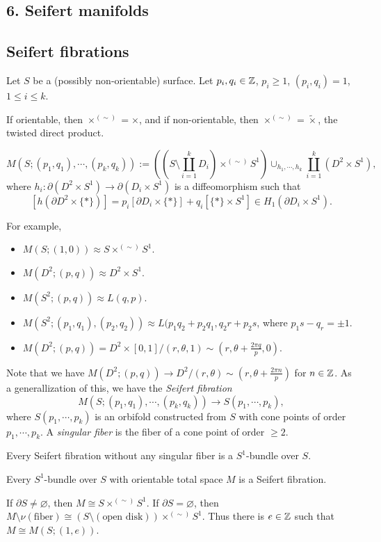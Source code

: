 \documentclass{../../../small}
\begin{document}
\setcounter{section}{6}
\subsection*{6. Seifert manifolds}
\subsection{Seifert fibrations}
\setcounter{thm}{0}

Let $S$ be a (possibly non-orientable) surface.
Let $p_i,q_i\in\mathbb{Z}$, $p_i\ge1$, $(p_i,q_i)=1$, $1\le i\le k$.

If orientable, then $\times^{(\sim)}=\times$, and if non-orientable, then $\times^{(\sim)}=\tilde\times$, the twisted direct product.

\[M(S;(p_1,q_1),\cdots,(p_k,q_k)):=\left((S\setminus\coprod_{i=1}^kD_i)\times^{(\sim)}S^1\right)\cup_{h_1,\cdots,h_k}\coprod_{i=1}^k(D^2\times S^1),\]
where $h_i:\partial(D^2\times S^1)\to\partial(D_i\times S^1)$ is a diffeomorphism such that
\[[h(\partial D^2\times\{*\})]=p_i[\partial D_i\times\{*\}]+q_i[\{*\}\times S^1]\in H_1(\partial D_i\times S^1).\]

For example,
\begin{itemize}
\item $M(S;(1,0))\approx S\times^{(\sim)}S^1$.
\item $M(D^2;(p,q))\approx D^2\times S^1$.
\item $M(S^2;(p,q))\approx L(q,p)$.
\item $M(S^2;(p_1,q_1),(p_2,q_2))\approx L(p_1q_2+p_2q_1,q_2r+p_2s$, where $p_1s-q_r=\pm1$.
\item $M(D^2;(p,q))=D^2\times[0,1]/(r,\theta,1)\sim(r,\theta+\frac{2\pi q}p,0)$.
\end{itemize}
Note that we have $M(D^2;(p,q))\to D^2/(r,\theta)\sim(r,\theta+\frac{2\pi n}p)$ for $n\in\mathbb{Z}$.
As a generallization of this, we have the \emph{Seifert fibration}
\[M(S;(p_1,q_1),\cdots,(p_k,q_k))\to S(p_1,\cdots,p_k),\]
where $S(p_1,\cdots,p_k)$ is an orbifold constructed from $S$ with cone points of order $p_1,\cdots,p_k$.
A \emph{singular fiber} is the fiber of a cone point of order $\ge2$.
\begin{rmk*}
Every Seifert fibration without any singular fiber is a $S^1$-bundle over $S$.
\end{rmk*}

\begin{prop}
Every $S^1$-bundle over $S$ with orientable total space $M$ is a Seifert fibration.
\end{prop}
\begin{pf}
If $\partial S\ne\varnothing$, then $M\cong S\times^{(\sim)}S^1$.
If $\partial S=\varnothing$, then $M\setminus\nu(\text{fiber})\cong(S\setminus(\text{open disk}))\times^{(\sim)}S^1$.
Thus there is $e\in\mathbb{Z}$ such that $M\cong M(S;(1,e))$.
\end{pf}
\end{document}
